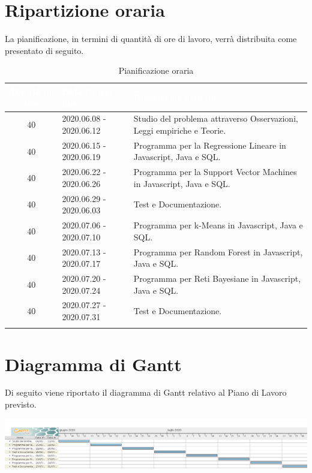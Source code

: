 \section{Ripartizione oraria}
La pianificazione, in termini di quantità di ore di lavoro, verrà distribuita come presentato di seguito.
{\renewcommand{\arraystretch}{2}
\begin{longtable}{|c|p{4cm}|p{7cm}|}
	
		\hline \rowcolor{blue}
		\textbf{\textcolor{white}{Durata in ore}} &
		\textbf{\textcolor{white}{Data (inizio - fine)}} & 
		\textbf{\textcolor{white}{Descrizione attività}}  \\ \hline
		\endhead
		\hline \rowcolor{lightbrown}
		40 & 
		2020.06.08 - 2020.06.12 & 
		Studio del problema attraverso Osservazioni, Leggi empiriche e Teorie. \\	
	\hline \rowcolor{lighterbrown}
		40 & 
		2020.06.15 - 2020.06.19 & 
		Programma per la Regressione Lineare in Javascript, Java e SQL. \\	
		\hline \rowcolor{lightbrown}
		40 & 
		2020.06.22 - 2020.06.26 & 
		Programma per la Support Vector Machines in Javascript, Java e SQL. \\	
	\hline \rowcolor{lighterbrown}
		40 & 
		2020.06.29 - 2020.06.03 & 
		Test e Documentazione. \\
		\hline \rowcolor{lightbrown}
		40 & 
		2020.07.06 - 2020.07.10 & 
		Programma per k-Means in Javascript, Java  e SQL. \\	
	\hline \rowcolor{lighterbrown}
		40 & 
		2020.07.13 - 2020.07.17 & 
		Programma per Random Forest in Javascript, Java e SQL. \\
	\hline \rowcolor{lightbrown}
		40 & 
		2020.07.20 - 2020.07.24 & 
		 Programma per Reti Bayesiane in Javascript, Java e SQL. \\
	\hline \rowcolor{lighterbrown}
		40 & 
		2020.07.27 - 2020.07.31 & 
		Test e Documentazione. \\
		\hline
		\caption{Pianificazione oraria}\label{tab:ore}
\end{longtable}}	

\section{Diagramma di Gantt}
Di seguito viene riportato il diagramma di Gantt relativo al Piano di Lavoro previsto.
\begin{center}
    \includegraphics[scale=0.3]{./img/GanttVale.png}
     \label{fig:ganttvale}
	 \end{center}
		